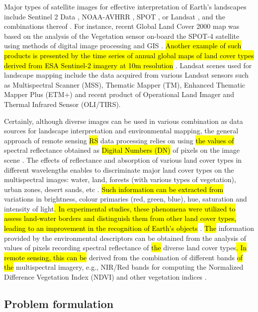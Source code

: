 \documentclass[earth,article,submit,pdftex,moreauthors]{Definitions/mdpi}
\begin{document}
Major types of satellite images for effective interpretation of Earth's landscapes include Sentinel 2 Data \cite{Ngom,TONG2020111598}, NOAA-AVHRR \cite{KONARSKA2002491,ANYAMBA2005596,Frederiksen}, SPOT \cite{SILVA2005188,MARTINEZ2011152}, or Landsat \cite{PIMPLE2020118007,Lemenkova202315}, and the combinations thereof \cite{rs12193157}. For instance, recent Global Land Cover 2000 map was based on the analysis of the Vegetation sensor on-board the SPOT-4 satellite using methods of digital image processing and GIS \cite{Mayaux}. \hl{Another example of such products is presented by the time series of annual global maps of land cover types derived from ESA Sentinel-2 imagery at 10m resolution }\cite{Karraetal}. Landsat scenes used for landscape mapping include the data acquired from various Landsat sensors such as Multispectral Scanner (MSS), Thematic Mapper (TM), Enhanced Thematic Mapper Plus (ETM+) and recent product of Operational Land Imager and Thermal Infrared Sensor (OLI/TIRS).

Certainly, although diverse images can be used in various combination as data sources for landscape interpretation and environmental mapping, the general approach of remote sensing \hl{RS} data processing relies on using \hl{the values of} spectral reflectance obtained as \hl{Digital Numbers (DN)} of pixels on the image scene \cite{ACKER2014}. The effects of reflectance and absorption of various land cover types in different wavelengths\hl{ }enables to discriminate major land cover types on the multispectral images: water, land, forests (with various types of vegetation), urban zones, desert sands, etc \cite{rs12101634}. \hl{Such information can be extracted from}  variations in brightness, colour primaries (red, green, blue), hue, saturation and intensity of light\hl{. In experimental studies, these phenomena were utilized to assess land-water borders and distinguish them from other land cover types, leading to an improvement in the recognition of Earth's objects} \cite{rs13132454}. \hl{The} information\hl{ }provided by the environmental descriptors\hl{ }can be obtained from the analysis of values of pixels recording spectral reflectance of \hl{the} diverse land cover types\hl{. In remote sensing, this can be} derived from the combination of different bands \hl{of the} multispectral imagery, e.g., NIR/Red bands for computing the Normalized Difference Vegetation Index (NDVI) and other vegetation indices \cite{CRIPPEN199071,LI2004463,jmse11040871,RUAN2022157075}.

\subsection{Problem formulation}
\end{document}
